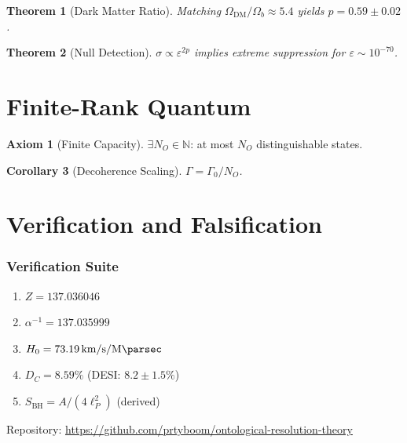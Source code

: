 \documentclass[12pt,a4paper]{article}
\numberwithin{equation}{section}
\theoremstyle{plain}
\newtheorem{theorem}{Theorem}[section]
\newtheorem{corollary}[theorem]{Corollary}
\theoremstyle{definition}
\newtheorem{axiom}{Axiom}[section]
\theoremstyle{remark}
\newcommand{\Zed}{\ensuremath{Z}}
\newcommand{\Hzero}{\ensuremath{H_0}}
\newcommand{\DC}{\ensuremath{D_C}}
\newcommand{\eps}{\ensuremath{\varepsilon}}
\newcommand{\Odm}{\ensuremath{\Omega_{\mathrm{DM}}}}
\newcommand{\Ob}{\ensuremath{\Omega_{b}}}
\begin{document}
\begin{theorem}[Dark Matter Ratio]
Matching $\Odm/\Ob \approx 5.4$ yields $p = 0.59 \pm 0.02$.
\end{theorem}

\begin{theorem}[Null Detection]
$\sigma \propto \eps^{2p}$ implies extreme suppression for $\eps \sim 10^{-70}$.
\end{theorem}

\part{Finite-Rank Quantum}

\begin{axiom}[Finite Capacity]
$\exists N_O \in \mathbb{N}$: at most $N_O$ distinguishable states.
\end{axiom}

\begin{corollary}[Decoherence Scaling]
$\Gamma = \Gamma_0 / N_O$.
\end{corollary}

\part{Verification and Falsification}

\section{Verification Suite}

\begin{enumerate}[label=\textbf{Test \arabic*.}]
\item $\Zed = 137.036046$
\item $\alpha^{-1} = 137.035999$
\item $\Hzero = \SI{73.19}{\kilo\meter\per\second\per\mega\parsec}$
\item $\DC = 8.59\%$ (DESI: $8.2 \pm 1.5\%$)
\item $S_{\mathrm{BH}} = A/(4\ell_P^2)$ (derived)
\end{enumerate}

Repository: \url{https://github.com/prtyboom/ontological-resolution-theory}
\end{document}
